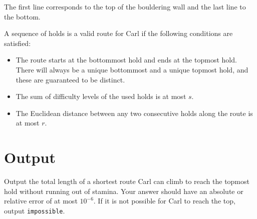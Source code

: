 The first line corresponds to the top of the bouldering wall and the last line to the bottom.

A sequence of holds is a valid route for Carl if the following conditions are satisfied:
\begin{itemize}
  \item The route starts at the bottommost hold and ends at the topmost hold. There will always be a unique bottommost and a unique topmost hold, and these are guaranteed to be distinct.
  \item The sum of difficulty levels of the used holds is at most $s$.
  \item The Euclidean distance between any two consecutive holds along the route is at most $r$.
\end{itemize}

\section*{Output}

Output the total length of a shortest route Carl can climb to reach the topmost hold without running out of stamina.
Your answer should have an absolute or relative error of at most $10^{-6}$. 
If it is not possible for Carl to reach the top, output \texttt{impossible}.
